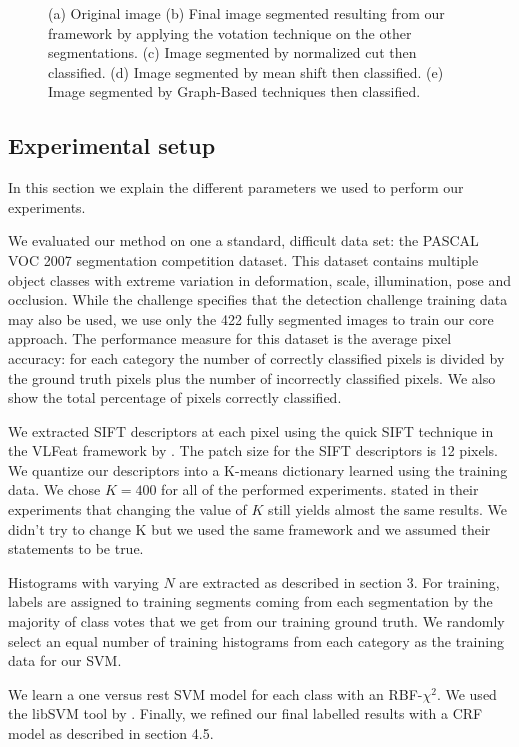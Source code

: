 \documentclass[twoside,11pt]{article}
\begin{document}
\begin{figure}[!t]
{}
\caption{(a) Original image (b) Final image segmented resulting from
our framework by applying the votation technique on the other segmentations.
(c) Image segmented by normalized cut then classified. (d) Image segmented
by mean shift then classified. (e) Image segmented by Graph-Based techniques
then classified.}
\label{fig:qual_res}
\end{figure}

\subsection{Experimental setup}

In this section we explain the different parameters we used to perform our
experiments.

We evaluated our method on one a standard, difficult data set: the
PASCAL VOC 2007 segmentation competition dataset. This dataset contains
multiple object classes with extreme variation in deformation, scale,
illumination, pose and occlusion. While the challenge specifies that the
detection challenge training data may also be used, we use only the 422 fully
segmented images to train our core approach. The performance measure for this
dataset is the average pixel accuracy: for each category the number of correctly
classified pixels is divided by the ground truth pixels plus the number of
incorrectly classified pixels. We also show the total percentage of pixels
correctly classified.

We extracted SIFT descriptors at each pixel using the quick SIFT technique in
the VLFeat framework by \cite{vedaldi08vlfeat}. The patch size for the SIFT
descriptors is 12 pixels. We quantize our descriptors into a K-means dictionary
learned using the training data. We chose $K = 400$ for all of the performed
experiments. \cite{fulkerson09class} stated in their experiments that changing
the value of $K$ still yields almost the same results. We didn't try to change K
but we used the same framework and we assumed their statements to be true.

Histograms with varying $N$ are extracted as described in section 3. For training,
labels are assigned to training segments coming from each segmentation by the
majority of class votes that we get from our training ground truth. We randomly
select an equal number of training histograms from each category as the training
data for our SVM.

We learn a one versus rest SVM model for each class with an RBF-$\chi^2$. We
used the libSVM tool by \cite{libsvm}. Finally, we refined our final labelled
results with a CRF model as described in section 4.5.
\end{document}
